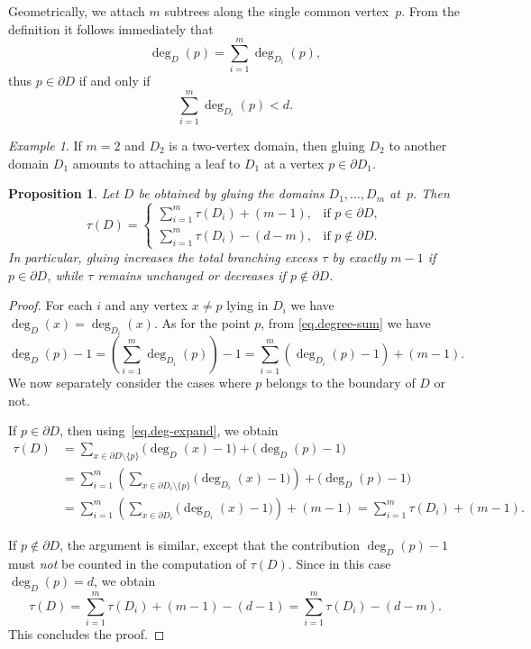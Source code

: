 \documentclass[a4paper, 11pt]{article}
\numberwithin{equation}{section}
\newtheorem{proposition}[theorem]{Proposition}
\theoremstyle{definition}
\theoremstyle{remark}
\newtheorem{example}[theorem]{Example}
\begin{document}
Geometrically, we attach $m$ subtrees along the single common vertex~$p$.  From the definition it follows immediately that
\begin{equation}\label{eq.degree-sum}
   \deg_D(p)=\sum_{i=1}^m \deg_{D_i}(p),
\end{equation}
thus $p\in\partial D$ if and only if
$$
   \sum_{i=1}^m \deg_{D_i}(p)<d.
$$
\begin{example}
If $m=2$ and $D_2$ is a two-vertex domain, then gluing $D_2$ to another domain $D_1$ amounts to attaching a leaf to $D_1$ at a vertex $p\in \partial D_1$.
\end{example}

\medskip

\begin{proposition}\label{prop:tau-gluing}
Let $D$ be obtained by gluing the domains $D_1,\dots,D_m$ at~$p$. Then
\[
   \tau(D) = \begin{cases}
       \displaystyle \sum_{i=1}^m \tau(D_i) + (m-1),          &\text{if } p\in\partial D, \\[0.3cm]
       \displaystyle \sum_{i=1}^m \tau(D_i) - (d-m),           &\text{if } p\notin\partial D .
     \end{cases}
\]
In particular, gluing increases the total branching excess  $\tau$ by exactly  $m-1$ if  $p\in \partial D$, while $\tau$ remains unchanged or decreases if  $p \not\in \partial D$.
\end{proposition}

\begin{proof}
For each $i$ and any vertex  $x\ne p$ lying in $D_i$ we have $\deg_D(x)=\deg_{D_i}(x)$.  As for the point $p$,  from \eqref{eq.degree-sum} we have
\begin{equation}\label{eq.deg-expand}
   \deg_D(p)-1  = \left( \sum_{i=1}^m \deg_{D_i}(p)\right) - 1    = \sum_{i=1}^m (\deg_{D_i}(p)-1) + (m-1).
\end{equation}
We now separately consider the cases where $p$ belongs to the boundary of $D$ or not.

\smallskip 

If  $p\in\partial D$, then  using~\eqref{eq.deg-expand}, we obtain
\begin{align*}
\tau(D)  &= \sum_{x\in \partial D\setminus \{p\}} \bigl(\deg_D(x)-1\bigr)    + \bigl(\deg_D(p)-1\bigr) 
 \\[0.3em] &=  \sum_{i=1}^m    \left(\sum_{x\in \partial D_i\setminus \{p\}}    \bigl(\deg_{D_i}(x)-1\bigr)\right)    + \bigl(\deg_D(p)-1\bigr) \\[0.3em]
&= \sum_{i=1}^m    \left(\sum_{x\in \partial D_i}    \bigl(\deg_{D_i}(x)-1\bigr)\right)    + (m-1)  = \sum_{i=1}^m \tau(D_i) + (m-1).
\end{align*}


\smallskip 

If $p\notin\partial D$, the argument is similar, except that the contribution $\deg_D(p)-1$ must \textit{not} be counted in the computation of $\tau(D)$. Since in this case $\deg_D(p)=d$, we obtain
\[
 \tau(D) = \sum_{i=1}^m \tau(D_i) + (m-1) - (d-1)  = \sum_{i=1}^m \tau(D_i) - (d-m).
\]
This concludes the proof.
\end{proof}
\end{document}
